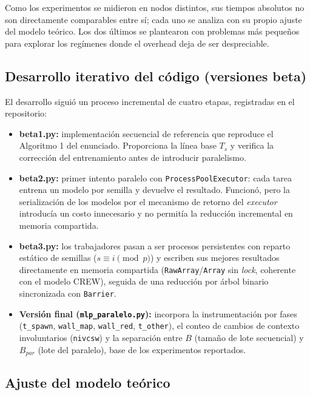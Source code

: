 \documentclass[11pt, a4paper]{article}
\begin{document}
Como los experimentos se midieron en nodos distintos, sus tiempos absolutos no son directamente comparables entre sí; cada uno se analiza con su propio ajuste del modelo teórico. Los dos últimos se plantearon con problemas más pequeños para explorar los regímenes donde el overhead deja de ser despreciable.

\subsection{Desarrollo iterativo del código (versiones beta)}

El desarrollo siguió un proceso incremental de cuatro etapas, registradas en el repositorio:

\begin{itemize}
    \item \textbf{beta1.py:} implementación secuencial de referencia que reproduce el Algoritmo 1 del enunciado. Proporciona la línea base $T_s$ y verifica la corrección del entrenamiento antes de introducir paralelismo.
    \item \textbf{beta2.py:} primer intento paralelo con \texttt{ProcessPoolExecutor}: cada tarea entrena un modelo por semilla y devuelve el resultado. Funcionó, pero la serialización de los modelos por el mecanismo de retorno del \textit{executor} introducía un costo innecesario y no permitía la reducción incremental en memoria compartida.
    \item \textbf{beta3.py:} los trabajadores pasan a ser procesos persistentes con reparto estático de semillas ($s \equiv i \pmod p$) y escriben sus mejores resultados directamente en memoria compartida (\texttt{RawArray}/\texttt{Array} sin \textit{lock}, coherente con el modelo CREW), seguida de una reducción por árbol binario sincronizada con \texttt{Barrier}.
    \item \textbf{Versión final (\texttt{mlp\_paralelo.py}):} incorpora la instrumentación por fases (\texttt{t\_spawn}, \texttt{wall\_map}, \texttt{wall\_red}, \texttt{t\_other}), el conteo de cambios de contexto involuntarios (\texttt{nivcsw}) y la separación entre $B$ (tamaño de lote secuencial) y $B_{par}$ (lote del paralelo), base de los experimentos reportados.
\end{itemize}

\subsection{Ajuste del modelo teórico}
\end{document}

